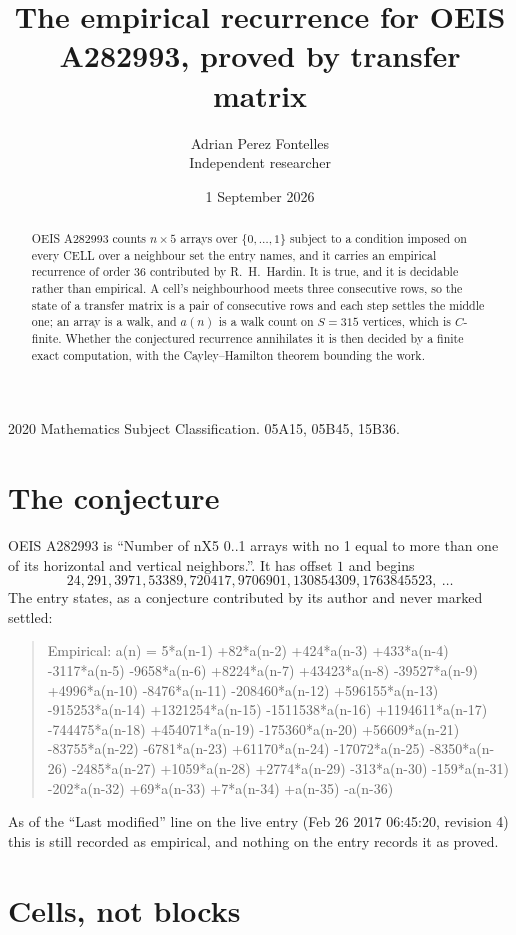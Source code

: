 \documentclass[11pt,a4paper]{article}
\title{The empirical recurrence for OEIS A282993, proved by transfer matrix}
\author{Adrian Perez Fontelles\\ \small Independent researcher}
\date{1 September 2026}
\theoremstyle{plain}
\theoremstyle{definition}
\begin{document}
\maketitle

\begin{abstract}
OEIS A282993 counts $n\times5$ arrays over $\{0,\dots,1\}$ subject to a condition imposed on
every CELL over a neighbour set the entry names, and it carries an empirical recurrence of
order $36$ contributed by R.~H.~Hardin. It is true, and it is decidable rather than
empirical. A cell's neighbourhood meets three consecutive rows, so the state of a transfer
matrix is a pair of consecutive rows and each step settles the middle one; an array is a
walk, and $a(n)$ is a walk count on $S=315$ vertices, which is $C$-finite. Whether the
conjectured recurrence annihilates it is then decided by a finite exact computation, with the
Cayley--Hamilton theorem bounding the work.
\end{abstract}

\noindent\small 2020 Mathematics Subject Classification. 05A15, 05B45, 15B36.\normalsize

\section{The conjecture}

OEIS A282993 is ``Number of nX5 0..1 arrays with no 1 equal to more than one of its horizontal and vertical neighbors.''. It has offset $1$ and begins
\[
24, 291, 3971, 53389, 720417, 9706901, 130854309, 1763845523,\ \dots
\]
The entry states, as a conjecture contributed by its author and never marked settled:
\begin{quote}
Empirical: a(n) = 5*a(n-1) +82*a(n-2) +424*a(n-3) +433*a(n-4) -3117*a(n-5) -9658*a(n-6) +8224*a(n-7) +43423*a(n-8) -39527*a(n-9) +4996*a(n-10) -8476*a(n-11) -208460*a(n-12) +596155*a(n-13) -915253*a(n-14) +1321254*a(n-15) -1511538*a(n-16) +1194611*a(n-17) -744475*a(n-18) +454071*a(n-19) -175360*a(n-20) +56609*a(n-21) -83755*a(n-22) -6781*a(n-23) +61170*a(n-24) -17072*a(n-25) -8350*a(n-26) -2485*a(n-27) +1059*a(n-28) +2774*a(n-29) -313*a(n-30) -159*a(n-31) -202*a(n-32) +69*a(n-33) +7*a(n-34) +a(n-35) -a(n-36)
\end{quote}
As of the ``Last modified'' line on the live entry (Feb 26 2017 06:45:20, revision 4) this is still
recorded as empirical, and nothing on the entry records it as proved.

\section{Cells, not blocks}
\end{document}
